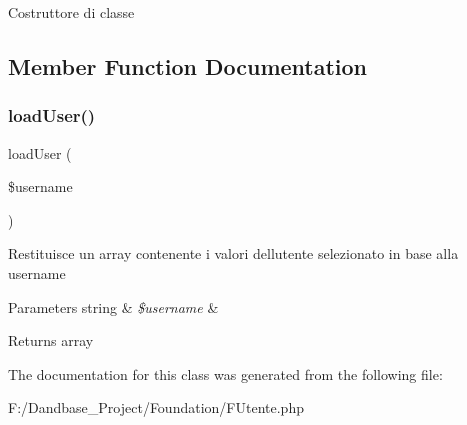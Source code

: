 Costruttore di classe 

\subsection{Member Function Documentation}
\mbox{\label{class_f_utente_a181f021166bb2b25b468928a8e21df0a}} 
\subsubsection{\texorpdfstring{load\+User()}{loadUser()}}
{\footnotesize\ttfamily load\+User (\begin{DoxyParamCaption}\item[{}]{\$username }\end{DoxyParamCaption})}

Restituisce un array contenente i valori dell\textquotesingle{}utente selezionato in base alla username


\begin{DoxyParams}[1]{Parameters}
string & {\em \$username} & \\
\hline
\end{DoxyParams}
\begin{DoxyReturn}{Returns}
array 
\end{DoxyReturn}


The documentation for this class was generated from the following file\+:\begin{DoxyCompactItemize}
\item 
F\+:/\+Dandbase\+\_\+\+Project/\+Foundation/F\+Utente.\+php\end{DoxyCompactItemize}

